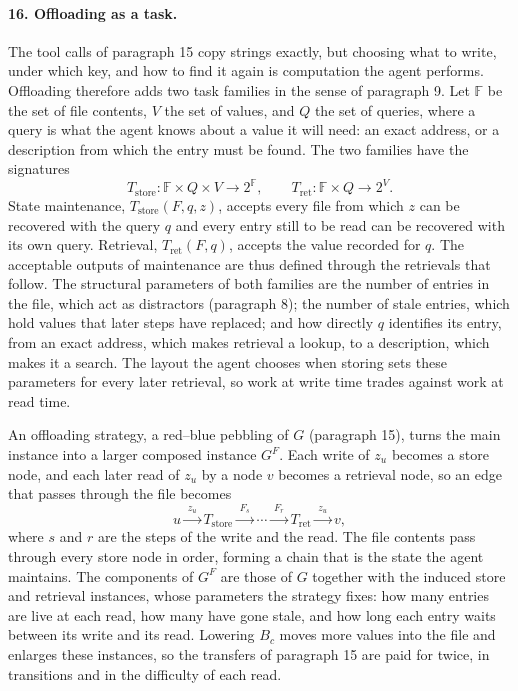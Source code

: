 \documentclass[11pt]{article}
\begin{document}
\paragraph{16. Offloading as a task.}
The tool calls of paragraph 15 copy strings exactly, but choosing what to
write, under which key, and how to find it again is computation the
agent performs. Offloading therefore adds two task families in the sense
of paragraph 9. Let $\mathbb F$ be the set of file contents, $V$ the set
of values, and $Q$ the set of queries, where a query is what the agent
knows about a value it will need: an exact address, or a description
from which the entry must be found. The two families have the signatures
\[
T_{\mathrm{store}}:\mathbb F\times Q\times V\longrightarrow 2^{\mathbb F},
\qquad
T_{\mathrm{ret}}:\mathbb F\times Q\longrightarrow 2^{V}.
\]
State maintenance, $T_{\mathrm{store}}(F,q,z)$, accepts every file from
which $z$ can be recovered with the query $q$ and every entry still to
be read can be recovered with its own query. Retrieval,
$T_{\mathrm{ret}}(F,q)$, accepts the value recorded for $q$. The
acceptable outputs of maintenance are thus defined through the
retrievals that follow. The structural parameters of both families are
the number of entries in the file, which act as distractors
(paragraph 8); the number of stale entries, which hold values that later
steps have replaced; and how directly $q$ identifies its entry, from an
exact address, which makes retrieval a lookup, to a description, which
makes it a search. The layout the agent chooses when storing sets these
parameters for every later retrieval, so work at write time trades
against work at read time.

An offloading strategy, a red--blue pebbling of $G$ (paragraph 15),
turns the main instance into a larger composed instance $G^F$. Each
write of $z_u$ becomes a store node, and each later read of $z_u$ by a
node $v$ becomes a retrieval node, so an edge that passes through the
file becomes
\[
u\xrightarrow{\;z_u\;}T_{\mathrm{store}}
\xrightarrow{\;F_s\;}\cdots\xrightarrow{\;F_r\;}
T_{\mathrm{ret}}\xrightarrow{\;z_u\;}v,
\]
where $s$ and $r$ are the steps of the write and the read. The file
contents pass through every store node in order, forming a chain that
is the state the agent maintains. The components of $G^F$ are those of
$G$ together with the induced store and retrieval instances, whose
parameters the strategy fixes: how many entries are live at each read,
how many have gone stale, and how long each entry waits between its
write and its read. Lowering $B_c$ moves more values into the file and
enlarges these instances, so the transfers of paragraph 15 are paid for
twice, in transitions and in the difficulty of each read.
\end{document}
